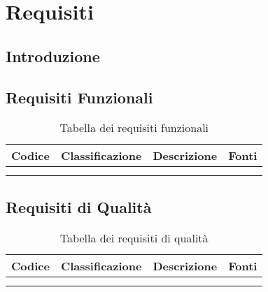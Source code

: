\chapter{Requisiti}


\section{Introduzione}
\section{Requisiti Funzionali}
\begin{table}[!ht]
  \centering
  \begin{tabular}{|c|c|c|c|}
    \hline
    \rowcolor[HTML]{036400}
    {\color[HTML]{FFFFFF} \textbf{Codice}} & {\color[HTML]{FFFFFF} \textbf{Classificazione}} & {\color[HTML]{FFFFFF} \textbf{Descrizione}} & {\color[HTML]{FFFFFF} \textbf{Fonti}} \\ \hline
    \rowcolor[HTML]{EFEFEF}
    &  &  &  \\ \hline
    \rowcolor[HTML]{C0C0C0}
    &  &  &  \\ \hline
  \end{tabular}
  \caption{Tabella dei requisiti funzionali}
\end{table}

\section{Requisiti di Qualità}
\begin{table}[!ht]
  \centering
  \begin{tabular}{|c|c|c|c|}
    \hline
    \rowcolor[HTML]{036400}
    {\color[HTML]{FFFFFF} \textbf{Codice}} & {\color[HTML]{FFFFFF} \textbf{Classificazione}} & {\color[HTML]{FFFFFF} \textbf{Descrizione}} & {\color[HTML]{FFFFFF} \textbf{Fonti}} \\ \hline
    \rowcolor[HTML]{EFEFEF}
    &  &  &  \\ \hline
    \rowcolor[HTML]{C0C0C0}
    &  &  &  \\ \hline
  \end{tabular}
  \caption{Tabella dei requisiti di qualità}
\end{table}


